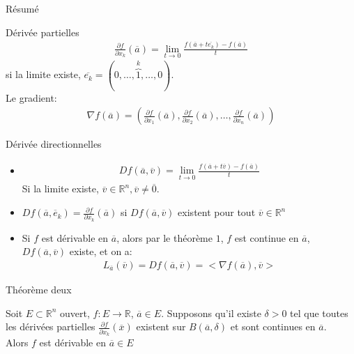 \begin{parag}{Résumé}
\begin{subparag}{Dérivée partielles}
   \begin{align*}
       \frac{\partial f}{\partial x_k}( \overline{a}) = \lim_{t \to 0} \frac{f( \overline{a} + t \overline{e_k})- f( \overline{a}) }{t}
   \end{align*}
   si la limite existe, $ \overline{e_k} = (0, \dots, \overbrace{1}^{k}, \dots, 0)$.\\
   Le gradient:
   \begin{align*}
       \nabla f( \overline{a}) = \left( \frac{\partial f}{\partial x_1}( \overline{a}), \frac{\partial f}{\partial x_2}( \overline{a}), \dots, \frac{\partial f}{\partial x_n}( \overline{a}) \right)
   \end{align*}
\end{subparag}

\begin{subparag}{Dérivée directionnelles}
    \begin{itemize}
        \item \begin{align*}
        Df( \overline{a}, \overline{v}) = \lim_{t \to 0} \frac{f( \overline{a} + t \overline{v}) - f( \overline{a})}{t}
    \end{align*}
    Si la limite existe, $ \overline{v} \in \mathbb{R}^n , \overline{v} \neq \overline{0}$.
\item $Df( \overline{a}, \overline{e}_k) = \frac{\partial f}{\partial x_k}( \overline{a})$ si $Df( \overline{a}, \overline{v})$ existent pour tout $ \overline{v} \in \mathbb{R}^n $
    \item Si $f$ est dérivable en $\overline{a}$, alors par le théorème $1$, $f$ est continue en $\overline{a}$, $Df( \overline{a}, \overline{v})$ existe, et on a:
\begin{align*}
    L_{ \overline{a}} ( \overline{v}) = Df( \overline{a}, \overline{v}) = < \nabla f( \overline{a}), \overline{v}>
\end{align*}

    
    
    \end{itemize}
\end{subparag}
\end{parag}

\begin{parag}{Théorème deux}
    \begin{theoreme}
        Soit $E \subset \mathbb{R}^n $ ouvert,  $f: E \to \mathbb{R}$, $\overline{a} \in E$. Supposons qu'il existe $ \delta > 0$ tel que toutes les dérivées partielles $ \frac{\partial f}{\partial x_k}( \overline{x})$ existent sur $B( \overline{a}, \delta)$ et sont continues en $\overline{a}$.\\
        Alors $f$ est dérivable en $\overline{a} \in E$
    \end{theoreme}
    

\end{parag}

